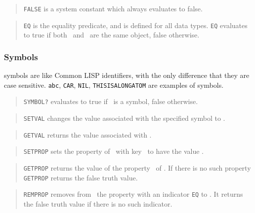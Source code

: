 \begin{quote}
	{\tt FALSE} is a system constant which always evaluates to false.
\end{quote}

\begin{quote}
	{\tt EQ} is the equality predicate, and is defined for all data types.
	{\tt EQ} evaluates to true if both \objone\ and \objtwo\ are the same
	object, false otherwise.
\end{quote}


\subsubsection{Symbols}

{\HG} symbols are like Common LISP identifiers, with the only difference that
they are case sensitive.
{\tt abc}, {\tt CAR}, {\tt NIL}, {\tt THISISALONGATOM} are examples of {\HG}
symbols.

\bigskip

\begin{quote}
	{\tt SYMBOL?} evaluates to true if \obj\ is a symbol, false otherwise.
\end{quote}

\begin{quote}
	{\tt SETVAL} changes the value associated with the specified symbol to \obj.
\end{quote}

\begin{quote}
	{\tt GETVAL} returns the value associated with \sym.
\end{quote}

\begin{quote}
	{\tt SETPROP} sets the property of \symone\ with key \symtwo\ to have the
	value \obj.
\end{quote}

\begin{quote}
	{\tt GETPROP} returns the value of the property \symtwo\ of \symone.
	If there is no such property {\tt GETPROP} returns the false truth value.
\end{quote}
 
\begin{quote}
	{\tt REMPROP} removes from \symone\ the property with an indicator {\tt EQ}
	to \symtwo. 
	It returns the false truth value if there is no such indicator.
\end{quote}


